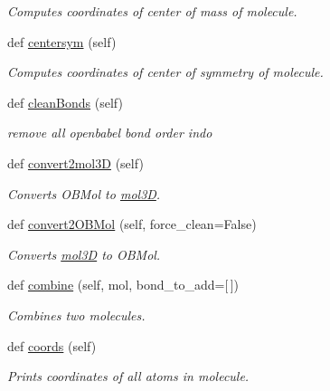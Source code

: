 \begin{DoxyCompactItemize}
\begin{DoxyCompactList}\small\item\em Computes coordinates of center of mass of molecule. \end{DoxyCompactList}\item 
def \hyperlink{classmolSimplify_1_1Classes_1_1mol3D_1_1mol3D_a0e4c145ac4c16e7be70cec1a3e03f6b7}{centersym} (self)
\begin{DoxyCompactList}\small\item\em Computes coordinates of center of symmetry of molecule. \end{DoxyCompactList}\item 
def \hyperlink{classmolSimplify_1_1Classes_1_1mol3D_1_1mol3D_af3406e507c8ccdd33996a7b6f5e3ddfe}{clean\+Bonds} (self)
\begin{DoxyCompactList}\small\item\em remove all openbabel bond order indo \end{DoxyCompactList}\item 
def \hyperlink{classmolSimplify_1_1Classes_1_1mol3D_1_1mol3D_a10ce42207cd8291c685640438f8de1a8}{convert2mol3D} (self)
\begin{DoxyCompactList}\small\item\em Converts O\+B\+Mol to \hyperlink{classmolSimplify_1_1Classes_1_1mol3D_1_1mol3D}{mol3D}. \end{DoxyCompactList}\item 
def \hyperlink{classmolSimplify_1_1Classes_1_1mol3D_1_1mol3D_a92d25b3e6fd4e17228b9b49cdab64c51}{convert2\+O\+B\+Mol} (self, force\+\_\+clean=False)
\begin{DoxyCompactList}\small\item\em Converts \hyperlink{classmolSimplify_1_1Classes_1_1mol3D_1_1mol3D}{mol3D} to O\+B\+Mol. \end{DoxyCompactList}\item 
def \hyperlink{classmolSimplify_1_1Classes_1_1mol3D_1_1mol3D_a8d6c548c5001b97eca53b4193eadd1ba}{combine} (self, mol, bond\+\_\+to\+\_\+add=\mbox{[}$\,$\mbox{]})
\begin{DoxyCompactList}\small\item\em Combines two molecules. \end{DoxyCompactList}\item 
def \hyperlink{classmolSimplify_1_1Classes_1_1mol3D_1_1mol3D_a551393e5c2417086b3b7855be3cf5957}{coords} (self)
\begin{DoxyCompactList}\small\item\em Prints coordinates of all atoms in molecule. \end{DoxyCompactList}\item 

\end{DoxyCompactItemize}
